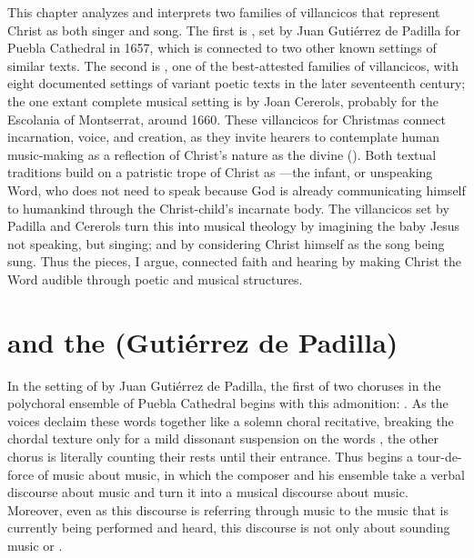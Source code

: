 This chapter analyzes and interprets two families of villancicos that represent
Christ as both singer and song.
The first is , set by Juan Gutiérrez de Padilla
for Puebla Cathedral in 1657, which is connected to two other known settings of
similar texts.
The second is , one of the
best-attested families of villancicos, with eight documented settings of variant
poetic texts in the later seventeenth century; the one extant complete musical
setting is by Joan Cererols, probably for the Escolania of Montserrat, around
1660.
These villancicos for Christmas connect incarnation, voice, and creation, as
they invite hearers to contemplate human music-making as a reflection of
Christ's nature as the divine  ().
Both textual traditions build on a patristic trope of Christ as
---the infant, or unspeaking Word, who does not need to
speak because God is already communicating himself to humankind through the
Christ-child's incarnate body.
The villancicos set by Padilla and Cererols turn this into musical theology by
imagining the baby Jesus not speaking, but singing; and by considering Christ
himself as the song being sung.
Thus the pieces, I argue, connected faith and hearing by making Christ the Word
audible through poetic and musical structures.

\section{ and the 
(Gutiérrez de Padilla)}

In the setting of  by Juan Gutiérrez de
Padilla, the first of two choruses in the polychoral ensemble of Puebla
Cathedral begins with this admonition: 
.
As the voices declaim these words together like a solemn choral recitative, 
breaking the chordal texture only for a mild dissonant suspension on the words
, the other chorus is literally counting their
\XXX[number of] rests until their entrance.
Thus begins a tour-de-force of music about music, in which the composer and his
ensemble take a verbal discourse about music and turn it into a musical
discourse about music.
Moreover, even as this discourse is referring through music to the music that is
currently being performed and heard, this discourse is not only about sounding
music or .

